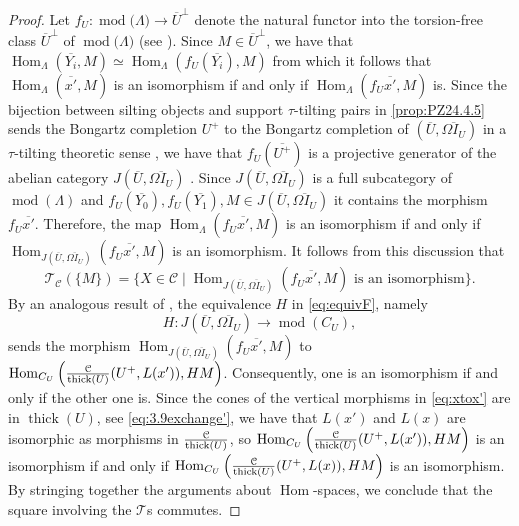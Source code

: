 \documentclass[10pt,twoside, a4paper,reqno]{amsart}
\DeclareMathOperator{\mods}{mod}
\DeclareMathOperator{\Hom}{Hom}
\DeclareMathOperator{\thick}{thick}
\newcommand{\sth}{\;\vert\;}
\newcommand{\calC}{\mathcal{C}}
\newcommand{\calT}{\mathcal{T}}
\theoremstyle{definition}
\begin{document}
\begin{proof}
Let $f_U\colon \mods{(}\Lambda{)} \rightarrow \overline{U}^{\perp}$ denote the natural functor into the torsion-free class $\overline{U}^{\perp}$ of $\mods{(}\Lambda{)}$ (see \cite{Dickson66}). Since $M\in {\overline{U}^\perp}$, we have {that} {$\Hom_{\Lambda}(\overline{Y_i}, M) \simeq \Hom_{\Lambda}(f_U(\overline{Y_i}), M)$ from which it follows that} $\Hom_{\Lambda}(\overline{x'}, M)$ is an isomorphism if and only if $ \Hom_{\Lambda}(f_U\overline{x'}, M)$ is.
Since the bijection between silting objects and support $\tau$-tilting pairs in \eqref{prop:PZ24.4.5} sends the Bongartz completion $U^+$ to the Bongartz completion of $(\overline{U},\overline{\Omega I_U})$ in a $\tau$-tilting theoretic sense \cite[Cor. 4.14]{PZ24}, we have that ${f}_U(\overline{U^+})$ is a projective generator of the abelian category $J(\overline{U}, \overline{\Omega I_U})$ \cite[Lem. 4.9]{BM18t}. 
Since $J(\overline{U}, \overline{\Omega I_U})$ is a full subcategory of $\mods(\Lambda)$ and $f_U(\overline{Y_0}), f_U(\overline{Y_1}), M \in J(\overline{U}, \overline{\Omega I_U})$ it contains the morphism $f_U\overline{x'}$. Therefore, the map $\Hom_{\Lambda}({{f}_U}\overline{x'}, M)$ is an isomorphism if and only if $\Hom_{J(\overline{U}, \overline{\Omega I_U})}(f_U\overline{x'}, M)$ is an isomorphism.
It follows from this discussion that
	\[  \calT_{\calC}(\{M\}) = \{ X \in \calC \sth \Hom_{J(\overline{U},\overline{\Omega I_U})}(f_U\overline{x'},M) \text{ is an isomorphism}\}. \]
By an analogous result of \cite[Prop. 4.15]{Jas15}, the equivalence $H$ in \eqref{eq:equivF}, namely
\begin{equation*}
	H\colon J(\overline{U},\overline{\Omega I_U}) \to \mods(C_U),
\end{equation*}
sends the morphism $\Hom_{J(\overline{U},\overline{\Omega I_U})}(f_U \overline{x'},M)$ to $\Hom_{C_U}\left({\calC \over \thick(U)}(U^+,L(x')),HM\right)$.
Consequently, one is an isomorphism if and only if the other one is.
Since the cones of the vertical morphisms in \eqref{eq:xtox'} are in $\thick(U)$, see {\cref{eq:3.9exchange'}}, we have that $L(x')$ and $L(x)$ are isomorphic as morphisms in ${\calC \over \thick(U)}$, so {$\Hom_{C_U}\left({\calC \over \thick(U)}(U^+,L(x')),HM\right)$} is an isomorphism if and only if $\Hom_{C_U}\left({\calC \over \thick(U)}(U^+,L(x)),HM\right)$ is an isomorphism. By stringing together the arguments about $\Hom$-spaces, we conclude that the square involving the $\calT$s commutes.


\end{proof}
\end{document}
